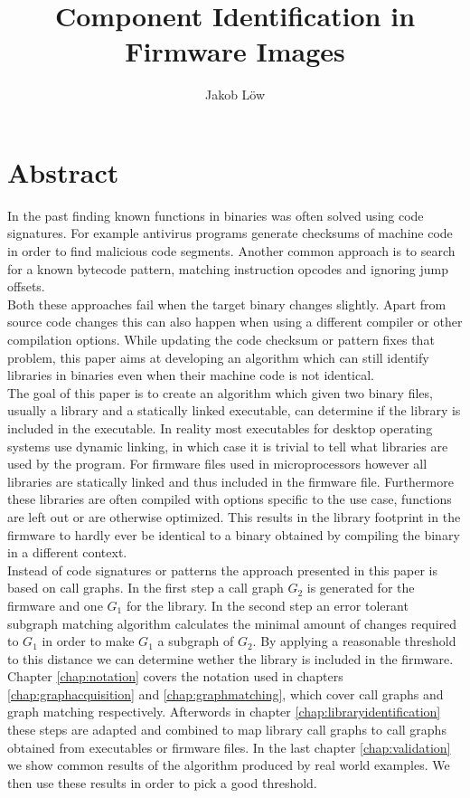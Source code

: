 \documentclass[
    12pt,                               %
    DIV=14,                     %
    parskip=half+,              %
    bigheadings,                %
    cleardoubleempty,   %
    halfparskip,                %
    ]{scrreprt} %
\title{Component Identification in Firmware Images}
\author{Jakob Löw}
\date{}
\begin{document}
\maketitle
\newpage

\tableofcontents
\newpage

\chapter{Abstract}
In the past finding known functions in binaries was often solved using code signatures. For example antivirus programs generate checksums of machine code in order to find malicious code segments. Another common approach is to search for a known bytecode pattern, matching instruction opcodes and ignoring jump offsets. \\
Both these approaches fail when the target binary changes slightly. Apart from source code changes this can also happen when using a different compiler or other compilation options. While updating the code checksum or pattern fixes that problem, this paper aims at developing an algorithm which can still identify libraries in binaries even when their machine code is not identical. \\
The goal of this paper is to create an algorithm which given two binary files, usually a library and a statically linked executable, can determine if the library is included in the executable. In reality most executables for desktop operating systems use dynamic linking, in which case it is trivial to tell what libraries are used by the program. For firmware files used in microprocessors however all libraries are statically linked and thus included in the firmware file. Furthermore these libraries are often compiled with options specific to the use case, functions are left out or are otherwise optimized. This results in the library footprint in the firmware to hardly ever be identical to a binary obtained by compiling the binary in a different context. \\
Instead of code signatures or patterns the approach presented in this paper is based on call graphs. In the first step a call graph $G_2$ is generated for the firmware and one $G_1$ for the library. In the second step an error tolerant subgraph matching algorithm calculates the minimal amount of changes required to $G_1$ in order to make $G_1$ a subgraph of $G_2$. By applying a reasonable threshold to this distance we can determine wether the library is included in the firmware. \\
Chapter \ref{chap:notation} covers the notation used in chapters \ref{chap:graphacquisition} and \ref{chap:graphmatching}, which cover call graphs and graph matching respectively. Afterwords in chapter \ref{chap:libraryidentification} these steps are adapted and combined to map library call graphs to call graphs obtained from executables or firmware files. In the last chapter \ref{chap:validation} we show common results of the algorithm produced by real world examples. We then use these results in order to pick a good threshold.
\end{document}
